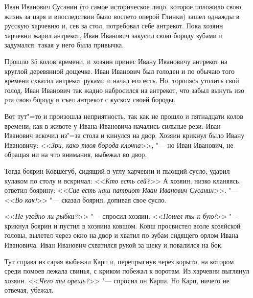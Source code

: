 
\hfill  {}

Иван Иванович Сусанин (то самое историческое лицо, которое положило свою жизнь за царя и впоследствии было воспето оперой Глинки) зашел однажды в русскую харчевню и, сев за стол, потребовал себе антрекот. Пока хозяин харчевни жарил антрекот, Иван Иванович закусил свою бороду зубами и задумался: такая у него была привычка.

Прошло 35 колов времени, и хозяин принес Ивану Ивановичу антрекот на круглой деревянной дощечке. Иван Иванович был голоден и по обычаю того времени схватил антрекот руками и начал его есть. Но, торопясь утолить свой голод, Иван Иванович так жадно набросился на антрекот, что забыл вынуть изо рта свою бороду и съел антрекот с куском своей бороды.

Вот тут"=то и произошла неприятность, так как не прошло и пятнадцати колов времени, как в животе у Ивана Ивановича начались сильные рези. Иван Иванович вскочил из"=за стола и кинулся на двор. Хозяин крикнул было Ивану Ивановичу: <<\textit{Зри, како твоя борода клочна}>>, "--- но Иван Иванович, не обращая ни на что внимания, выбежал во двор.

Тогда боярин Ковшегуб, сидящий в углу харчевни и пьющий сусло, ударил кулаком по столу и вскричал: <<\textit{Кто есть сей?}>> А хозяин, низко кланяясь, ответил боярину: <<\textit{Сие есть наш патриот Иван Иванович Сусанин}>>. "--- <<\textit{Во как!}>> "--- сказал боярин, допивая свое сусло.

<<\textit{Не угодно ли рыбки?}>> "--- спросил хозяин. <<\textit{Пошел ты к бую!}>> "--- крикнул боярин и пустил в хозяина ковшом. Ковш просвистел возле хозяйской головы, вылетел через окно на двор и хватил по зубам сидящего орлом Ивана Ивановича. Иван Иванович схватился рукой за щеку и повалился на бок.

Тут справа из сарая выбежал Карп и, перепрыгнув через корыто, на котором среди помоев лежала свинья, с криком побежал к воротам. Из харчевни выглянул хозяин. <<\textit{Чего ты орешь?}>> "--- спросил он Карпа. Но Карп, ничего не отвечая, убежал.

